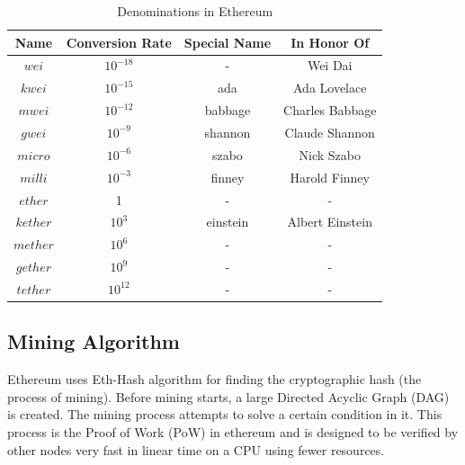 \documentclass[11pt,openright]{report}
\begin{document}
\begin{table}[!htbp]
	\renewcommand{\arraystretch}{1.3}
	\caption{Denominations in Ethereum}
	\label{eth_denominations}
	\centering
	\begin{tabular}{|c||c|c|c|}
		\hline
		\bfseries Name & \bfseries Conversion Rate & \bfseries Special Name & \bfseries In Honor Of\\
		\hline\hline
		$wei$ & $10^{-18}$ & - & Wei Dai \\ \hline
	    $kwei$ & $10^{-15}$ & ada & Ada Lovelace \\ \hline
	    $mwei$ & $10^{-12}$ & babbage & Charles Babbage \\ \hline
	    $gwei$ & $10^{-9}$ & shannon & Claude Shannon \\ \hline
	    $micro$ & $10^{-6}$ & szabo & Nick Szabo \\ \hline
	    $milli$ & $10^{-3}$ & finney & Harold Finney \\ \hline
	    $ether$ & 1 & - & - \\ \hline
	    $kether$ & $10^{3}$ & einstein & Albert Einstein \\ \hline
	    $mether$ & $10^{6}$ & - & - \\ \hline
	    $gether$ & $10^{9}$ & - & - \\ \hline
	    $tether$ & $10^{12}$ & - & - \\ \hline
	\end{tabular}
\end{table}

\subsection{Mining Algorithm}
Ethereum uses Eth-Hash algorithm \cite{wood2014yellow} for finding the cryptographic hash (the process of mining). Before mining starts, a large Directed Acyclic Graph (DAG) is created. The mining process attempts to solve a certain condition in it. This process is the Proof of Work (PoW) in ethereum and is designed to be verified by other nodes very fast in linear time on a CPU using fewer resources.
\end{document}
